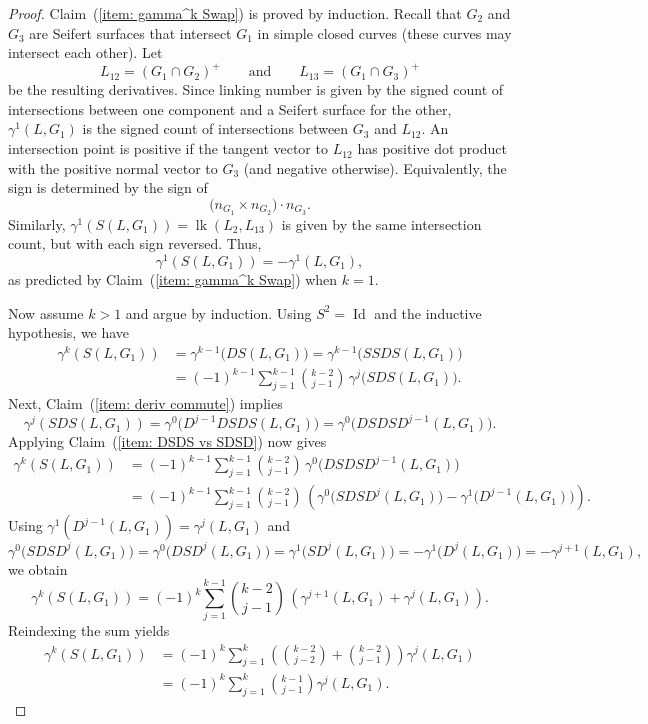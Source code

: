 \documentclass[a4paper, 11pt]{amsart}
\theoremstyle{definition}
\newcommand{\lk}{\operatorname{lk}}
\newcommand{\Id}{\operatorname{Id}}
\newcommand{\Swap}{S}%
\newcommand{\pref}[1]{(\ref{#1})}
\begin{document}
\begin{proof}
Claim~\pref{item: gamma^k Swap} is proved by induction. Recall that $G_2$ and $G_3$ are Seifert surfaces that intersect $G_1$ in simple closed curves (these curves may intersect each other). Let
\[
L_{12}=(G_1\cap G_2)^+
\qquad\text{and}\qquad
L_{13}=(G_1\cap G_3)^+
\]
be the resulting derivatives. Since linking number is given by the signed count of intersections between one component and a Seifert surface for the other, $\gamma^1(L,G_1)$ is the signed count of intersections between $G_3$ and $L_{12}$. An intersection point is positive if the tangent vector to $L_{12}$ has positive dot product with the positive normal vector to $G_3$ (and negative otherwise). Equivalently, the sign is determined by the sign of
\[
\bigl(n_{G_1}\times n_{G_2}\bigr)\cdot n_{G_3}.
\]
Similarly, $\gamma^1(\Swap(L,G_1))=\lk(L_2,L_{13})$ is given by the same intersection count, but with each sign reversed. Thus,
\[
\gamma^1(\Swap(L,G_1))=-\gamma^1(L,G_1),
\]
as predicted by Claim~\pref{item: gamma^k Swap} when $k=1$.

Now assume $k>1$ and argue by induction. Using $\Swap^2=\Id$ and the inductive hypothesis, we have
\begin{align*}
\gamma^k(\Swap(L,G_1))
&=\gamma^{k-1}\bigl(D\Swap(L,G_1)\bigr)
=\gamma^{k-1}\bigl(\Swap\Swap D\Swap(L,G_1)\bigr) \\
&=(-1)^{k-1}\sum_{j=1}^{k-1} {k-2 \choose j-1}\,
\gamma^j\bigl(\Swap D\Swap(L,G_1)\bigr).
\end{align*}
Next, Claim~\pref{item: deriv commute} implies
\[
\gamma^j(\Swap D\Swap(L,G_1))
=\gamma^0\bigl(D^{j-1}D\Swap D\Swap(L,G_1)\bigr)
=\gamma^0\bigl(D\Swap D\Swap D^{j-1}(L,G_1)\bigr).
\]
Applying Claim~\pref{item: DSDS vs SDSD} now gives
\begin{align*}
\gamma^k(\Swap(L,G_1))
&=(-1)^{k-1}\sum_{j=1}^{k-1} {k-2 \choose j-1}\,
\gamma^0\bigl(D\Swap D\Swap D^{j-1}(L,G_1)\bigr) \\
&=(-1)^{k-1}\sum_{j=1}^{k-1} {k-2 \choose j-1}\,
\left(\gamma^0\bigl(\Swap D\Swap D^{j}(L,G_1)\bigr)-\gamma^1\bigl(D^{j-1}(L,G_1)\bigr)\right).
\end{align*}
Using $\gamma^1(D^{j-1}(L,G_1))=\gamma^j(L,G_1)$ and
\[
\gamma^0\bigl(\Swap D\Swap D^j(L,G_1)\bigr)
=\gamma^0\bigl(D\Swap D^j(L,G_1)\bigr)
=\gamma^1\bigl(\Swap D^j(L,G_1)\bigr)
=-\gamma^1\bigl(D^j(L,G_1)\bigr)
=-\gamma^{j+1}(L,G_1),
\]
we obtain
\[
\gamma^k(\Swap(L,G_1))
=
(-1)^k\sum_{j=1}^{k-1} {k-2 \choose j-1}\,
\left(\gamma^{j+1}(L,G_1)+\gamma^j(L,G_1)\right).
\]
Reindexing the sum yields
\begin{align*}
\gamma^k(\Swap(L,G_1))
&=
(-1)^k\sum_{j=1}^{k}
\left({k-2 \choose j-2}+{k-2 \choose j-1}\right)\gamma^j(L,G_1) \\
&=
(-1)^k\sum_{j=1}^{k} {k-1 \choose j-1}\gamma^j(L,G_1).
\end{align*}


\end{proof}
\end{document}
